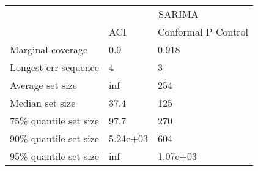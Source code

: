 \begin{tabular}{lll}
\toprule
& \multicolumn{2}{c}{SARIMA} \\
& ACI & Conformal P Control \\
\midrule
Marginal coverage & 0.9 & 0.918 \\
Longest err sequence & 4 & 3 \\
Average set size & inf & 254 \\
Median set size & 37.4 & 125 \\
75\% quantile set size & 97.7 & 270 \\
90\% quantile set size & 5.24e+03 & 604 \\
95\% quantile set size & inf & 1.07e+03 \\
\bottomrule
\end{tabular}
